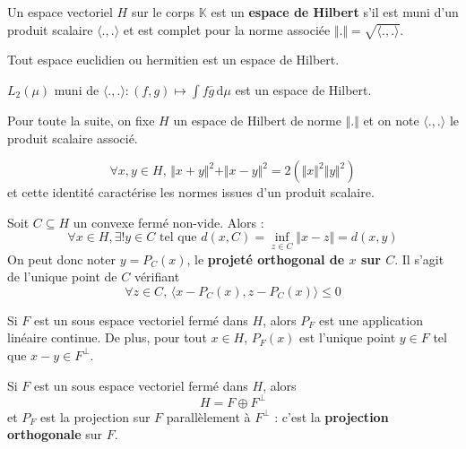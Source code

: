 
  \begin{definition}
    Un espace vectoriel $H$ sur le corps $\mathbb{K}$ est un \textbf{espace de Hilbert} s'il est muni d'un produit scalaire $\langle . , . \rangle$ et est complet pour la norme associée $\Vert . \Vert = \sqrt{\langle . , . \rangle}$.
  \end{definition}

  \begin{example}
    Tout espace euclidien ou hermitien est un espace de Hilbert.
  \end{example}

  \begin{example}
    $L_2(\mu)$ muni de $\langle . , . \rangle : (f,g) \mapsto \int f \overline{g} \, \mathrm{d}\mu$ est un espace de Hilbert.
  \end{example}

  Pour toute la suite, on fixe $H$ un espace de Hilbert de norme $\Vert . \Vert$ et on note $\langle ., . \rangle$ le produit scalaire associé.

  \begin{lemma}
    \[ \forall x, y \in H, \, \Vert x + y \Vert^2 + \Vert x - y \Vert^2 = 2(\Vert x \Vert^2 \Vert y \Vert^2) \]
    et cette identité caractérise les normes issues d'un produit scalaire.
  \end{lemma}


  \begin{theorem}
    Soit $C \subseteq H$ un convexe fermé non-vide. Alors :
    \[ \forall x \in H, \exists! y \in C \text{ tel que } d(x, C) = \inf_{z \in C} \Vert x - z \Vert = d(x, y) \]
    On peut donc noter $y = P_C(x)$, le \textbf{projeté orthogonal de $x$ sur $C$}. Il s'agit de l'unique point de $C$ vérifiant
    \[ \forall z \in C, \, \langle x - P_C(x), z - P_C(x) \rangle \leq 0 \]
  \end{theorem}

  \begin{theorem}
    Si $F$ est un sous espace vectoriel fermé dans $H$, alors $P_F$ est une application linéaire continue. De plus, pour tout $x \in H$, $P_F(x)$ est l'unique point $y \in F$ tel que $x-y \in F^\perp$.
  \end{theorem}

  \begin{theorem}
    Si $F$ est un sous espace vectoriel fermé dans $H$, alors
    \[ H = F \oplus F^\perp \]
    et $P_F$ est la projection sur $F$ parallèlement à $F^\perp$ : c'est la \textbf{projection orthogonale} sur $F$.
  \end{theorem}

